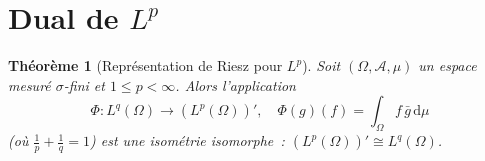 \documentclass[a4paper,12pt]{book}
\newcommand{\dd}{\mathrm{d}}
\theoremstyle{definition}
\theoremstyle{plain}
\newtheorem{theoreme}[definition]{Théorème}
\theoremstyle{remark}
\begin{document}
\section{Dual de $L^p$}

\begin{theoreme}[Représentation de Riesz pour $L^p$]
\label{thm:dual-Lp}
Soit $(\Omega, \mathcal{A}, \mu)$ un espace mesuré $\sigma$-fini et $1 \le p < \infty$.
Alors l'application
\[
  \Phi : L^q(\Omega) \to (L^p(\Omega))', \quad
  \Phi(g)(f) = \int_\Omega f\,\bar g\,\dd\mu
\]
(où $\frac{1}{p} + \frac{1}{q} = 1$) est une isométrie isomorphe~:
$(L^p(\Omega))' \cong L^q(\Omega)$.
\end{theoreme}
\end{document}
